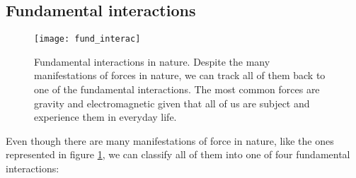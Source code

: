 \subsection{Fundamental interactions}\label{fund_inter}

\begin{figure}[h!]
  \centering
  \texttt{[image: fund\_interac]}
  \caption[Fundamental interactions in nature.]{Fundamental interactions in nature. Despite the many manifestations of forces in nature, we can track all of them back to one of the fundamental interactions. The most common forces are gravity and electromagnetic given that all of us are subject and experience them in everyday life.}
  \label{fund_interac}
\end{figure}

\noindent Even though there are many manifestations of force in nature, like the ones represented in figure \ref{fund_interac}, we can classify all of them into one of four fundamental interactions:

